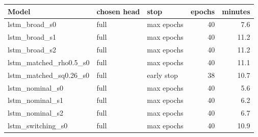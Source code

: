 \begin{tabular}{lllrr}
\toprule
Model & chosen head & stop & epochs & minutes \\
\midrule
lstm\_broad\_s0 & full & max epochs & 40 & 7.6 \\
lstm\_broad\_s1 & full & max epochs & 40 & 11.2 \\
lstm\_broad\_s2 & full & max epochs & 40 & 11.2 \\
lstm\_matched\_rho0.5\_s0 & full & max epochs & 40 & 11.1 \\
lstm\_matched\_sq0.26\_s0 & full & early stop & 38 & 10.7 \\
lstm\_nominal\_s0 & full & max epochs & 40 & 5.6 \\
lstm\_nominal\_s1 & full & max epochs & 40 & 6.2 \\
lstm\_nominal\_s2 & full & max epochs & 40 & 6.7 \\
lstm\_switching\_s0 & full & max epochs & 40 & 10.9 \\
\bottomrule
\end{tabular}